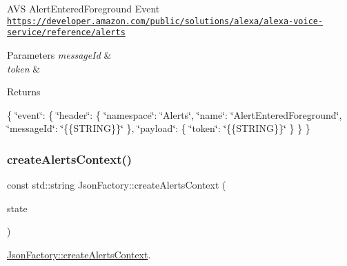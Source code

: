 A\+VS Alert\+Entered\+Foreground Event \href{https://developer.amazon.com/public/solutions/alexa/alexa-voice-service/reference/alerts}{\tt https\+://developer.\+amazon.\+com/public/solutions/alexa/alexa-\/voice-\/service/reference/alerts} 
\begin{DoxyParams}{Parameters}
{\em message\+Id} & \\
\hline
{\em token} & \\
\hline
\end{DoxyParams}
\begin{DoxyReturn}{Returns}

\end{DoxyReturn}
\{ \char`\"{}event\char`\"{}\+: \{ \char`\"{}header\char`\"{}\+: \{ \char`\"{}namespace\char`\"{}\+: \char`\"{}\+Alerts\char`\"{}, \char`\"{}name\char`\"{}\+: \char`\"{}\+Alert\+Entered\+Foreground\char`\"{}, \char`\"{}message\+Id\char`\"{}\+: \char`\"{}\{\{\+S\+T\+R\+I\+N\+G\}\}\char`\"{} \}, \char`\"{}payload\char`\"{}\+: \{ \char`\"{}token\char`\"{}\+: \char`\"{}\{\{\+S\+T\+R\+I\+N\+G\}\}\char`\"{} \} \} \} \mbox{\label{classAVSJson_1_1JsonFactory_aa6aab87bcc8fcb68add7dc86fac36bf0}} 
\subsubsection{\texorpdfstring{create\+Alerts\+Context()}{createAlertsContext()}}
{\footnotesize\ttfamily const std\+::string Json\+Factory\+::create\+Alerts\+Context (\begin{DoxyParamCaption}\item[{const \hyperlink{structAVSJson_1_1AlertsState}{Alerts\+State} $\ast$}]{state }\end{DoxyParamCaption})\hspace{0.3cm}{\ttfamily [protected]}}



\hyperlink{classAVSJson_1_1JsonFactory_aa6aab87bcc8fcb68add7dc86fac36bf0}{Json\+Factory\+::create\+Alerts\+Context}. 

